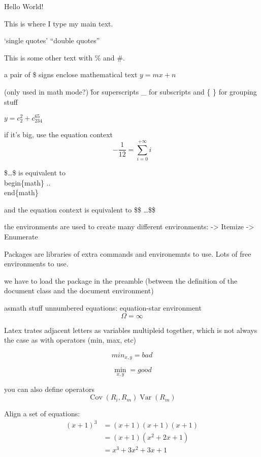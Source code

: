 \documentclass{article}
\begin{document}
Hello World!

This is where I type my main text.

`single quotes'
``double quotes''


This is some other text with \% and \#.

a pair of \$ signs enclose mathematical text
$y=mx+n$

(only used in math mode?) \^  for superscripts \_ for subscripts and \{ \} for grouping stuff

$y = c_2^2 + c_{234}^{65}$

if it's big, use the equation context
\begin{equation}
-\frac{1}{12} = \sum_{i=0}^{+\infty}i
\end{equation}

\$\dots\$ is equivalent to \\begin\{math\} .. \\end\{math\}

and the equation context is equivalent to \$\$ \dots  \$\$

the environments are used to create many different environments:
-> Itemize
-> Enumerate

Packages are libraries of extra commands and environemnts to use.
Lots of free environments to use.

we have to load the package in the preamble (between the definition of the document class and
the document environment)

asmath stuff
unnumbered equations: equation-star environment
\begin{equation*}
    \Omega = \infty
\end{equation*}


Latex trates adjacent letters as variables multipleid together, which is not always the case
as with operators (min, max, etc)

\begin{equation*}
    min_{x,y} = bad
\end{equation*}

\begin{equation*}
    \min_{x,y} = good
\end{equation*}

you can also define operators
\begin{equation*}
    \operatorname{Cov}(R_i, R_m)
    \operatorname{Var}(R_m)
\end{equation*}


Align a set of equations:
\begin{align*}
    (x + 1)^3   &= (x+1)(x+1)(x+1 ) \\
                &= (x+1)(x^2 + 2x + 1) \\
                &= x^3 + 3x^2 + 3x + 1
\end{align*}
\end{document}
